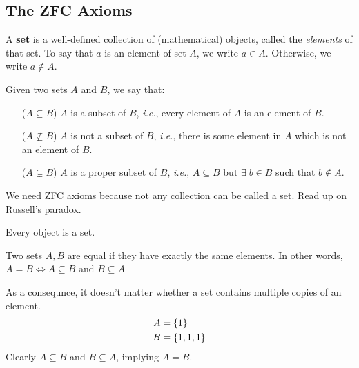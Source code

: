 \subsection{The ZFC Axioms} \vskip 5pt
\begin{defn} \label{defn:set}
    A \textbf{set} is a well-defined collection of (mathematical) objects, called the \emph{elements} of that set.
    To say that $a$ is an element of set $A$, we write $a \in A$.
    Otherwise, we write $a \notin A$.

    Given two sets $A$ and $B$, we say that:
    \begin{enumerate}[wide]
        \item[($A \subseteq B$)] $A$ is a subset of $B$, \textit{i.e.}, every element of $A$ is an element of $B$.
        \item[($A \not\subseteq B$)] $A$ is not a subset of $B$, \textit{i.e.}, there is some element in $A$ which is not an element of $B$.
        \item[($A \subsetneq B$)] $A$ is a proper subset of $B$, \textit{i.e.}, $A \subseteq B$ but $\exists\; b \in B$ such that $b \notin A$.
    \end{enumerate}
\end{defn}

\begin{rem}
    We need ZFC axioms because not any collection can be called a set.
    Read up on Russell's paradox.
\end{rem}

\begin{axiom} \label{zfc:basic}
    Every object is a set.
\end{axiom}

\begin{axiom} \label{zfc:extension}
    Two sets $A, B$ are equal if they have exactly the same elements.
    In other words, $A = B \iff A \subseteq B$ and $B \subseteq A$
\end{axiom}
\begin{rem}
    As a consequnce, it doesn't matter whether a set contains multiple copies of an element.
    \begin{align*}
        A &= \set{1} \\
        B &= \set{1, 1, 1}
    \end{align*}
    Clearly $A \subseteq B$ and $B \subseteq A$, implying $A = B$.
\end{rem}

